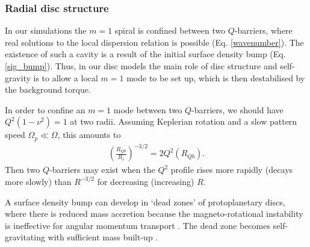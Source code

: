{  %

  
  
  
 
  \subsubsection{Radial disc structure}
  In our simulations the 
  $m=1$ spiral is confined between two $Q$-barriers, where real solutions to the local
  dispersion relation is possible (Eq. \ref{wavenumber}). The
  existence of such a cavity is a result of the initial surface
  density bump (Eq. \ref{sig_bump}).  
  Thus, in our disc models the main role of disc structure 
  and self-gravity is to allow a local $m=1$ mode to be set up, which is then 
  destabilised by the background torque. 
  
  In order to confine an $m=1$ mode between two $Q$-barriers, we
  should have $Q^2(1-\nu^2)=1$ at two radii. Assuming 
  Keplerian rotation and a slow pattern speed $\Omega_p\ll\Omega$,
  this amounts to 
  \begin{align}\label{qb_cond}
    \left(\frac{R_{Qb}}{R_c}\right)^{-3/2} = 2Q^2(R_{Qb}). 
  \end{align}
  Then two $Q$-barriers may exist when the $Q^2$ profile
  rises more rapidly (decays more slowly) than $R^{-3/2}$
  for decreasing (increasing) $R$. 
  
  A surface density bump can develop in 
  `dead zones' of protoplanetary 
  discs, where there is reduced mass accretion because the magneto-rotational 
  instability is ineffective for angular momentum transport 
  \citep{gammie96,turner08,landry13}. The dead zone becomes 
  self-gravitating with sufficient mass built-up 
  \citep{armitage01,martin12,martin12b,zhu09,zhu10,zhu10b,bae13}.  
  
}
